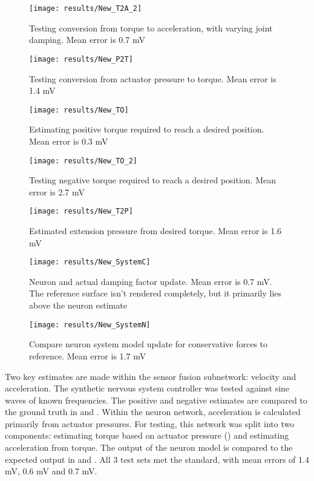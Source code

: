 \begin{figure}
\centering
\texttt{[image: results/New\_T2A\_2]}
\caption{Testing conversion from torque to acceleration, with varying joint damping. Mean error is 0.7 mV}
\label{fig:TestAccelDamping}
\end{figure}

\begin{figure}
\centering
\texttt{[image: results/New\_P2T]}
\caption{Testing conversion from actuator pressure to torque. Mean error is 1.4 mV}
\label{fig:TestP2T}
\end{figure}

\begin{figure}
\centering
\texttt{[image: results/New\_TO]}
\caption{Estimating positive torque required to reach a desired position. Mean error is 0.3 mV}
\label{fig:TestTorqueOptimizationPos}
\end{figure}

\begin{figure}
\centering
\texttt{[image: results/New\_TO\_2]}
\caption{Testing negative torque required to reach a desired position. Mean error is 2.7 mV}
\label{fig:TestTorqueOptimizationNeg}
\end{figure}

\begin{figure}
\centering
\texttt{[image: results/New\_T2P]}
\caption{Estimated extension pressure from desired torque. Mean error is 1.6 mV}
\label{fig:TestT2PPos}
\end{figure}

\begin{figure}
\centering
\texttt{[image: results/New\_SystemC]}
\caption{Neuron and actual damping factor update. Mean error is 0.7 mV. The reference surface isn't rendered completely, but it primarily lies above the neuron estimate}
\label{fig:TestSystemCPos}
\end{figure}

\begin{figure}
\centering
\texttt{[image: results/New\_SystemN]}
\caption{Compare neuron system model update for conservative forces to reference. Mean error is 1.7 mV}
\label{fig:TestSystemNPos}
\end{figure}


Two key estimates are made within the sensor fusion subnetwork: velocity and
acceleration. The synthetic nervous system controller was tested against sine waves of known
frequencies. The positive and negative estimates are compared to the ground truth in  and .
Within the neuron network, acceleration is calculated primarily from actuator
pressures. For testing, this network was split into two components: estimating
torque based on actuator pressure () and estimating acceleration from torque. The
output of the neuron model is compared to the expected output in
 and . All 3 test sets met the standard, with
mean errors of 1.4 mV, 0.6 mV and 0.7 mV.


